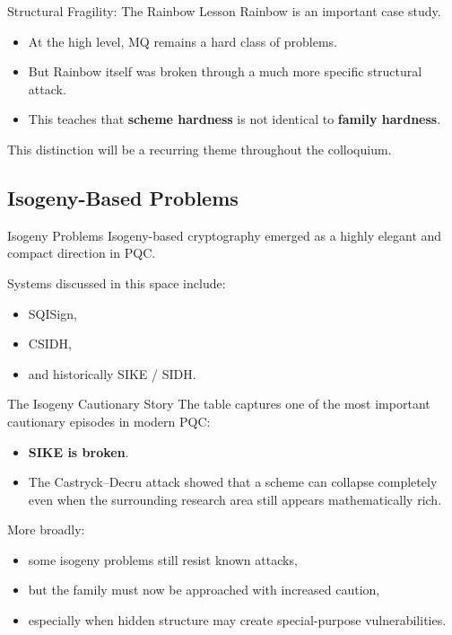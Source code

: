 \documentclass[aspectratio=169]{beamer}
\begin{document}
	\begin{frame}{Structural Fragility: The Rainbow Lesson}
		Rainbow is an important case study.
		\begin{itemize}
			\item At the high level, MQ remains a hard class of problems.
			\item But Rainbow itself was broken through a much more specific structural attack.
			\item This teaches that \textbf{scheme hardness} is not identical to \textbf{family hardness}.
		\end{itemize}
		
		\vspace{0.5em}
		This distinction will be a recurring theme throughout the colloquium.
	\end{frame}
	
	\subsection{Isogeny-Based Problems}
	
	\begin{frame}{Isogeny Problems}
		Isogeny-based cryptography emerged as a highly elegant and compact direction in PQC.
		
		\vspace{0.5em}
		Systems discussed in this space include:
		\begin{itemize}
			\item SQISign,
			\item CSIDH,
			\item and historically SIKE / SIDH.
		\end{itemize}
	\end{frame}
	
	\begin{frame}{The Isogeny Cautionary Story}
		The table captures one of the most important cautionary episodes in modern PQC:
		\begin{itemize}
			\item \textbf{SIKE is broken}.
			\item The Castryck--Decru attack showed that a scheme can collapse completely even when the surrounding research area still appears mathematically rich.
		\end{itemize}
		
		\vspace{0.5em}
		More broadly:
		\begin{itemize}
			\item some isogeny problems still resist known attacks,
			\item but the family must now be approached with increased caution,
			\item especially when hidden structure may create special-purpose vulnerabilities.
		\end{itemize}
	\end{frame}
	
\end{document}
